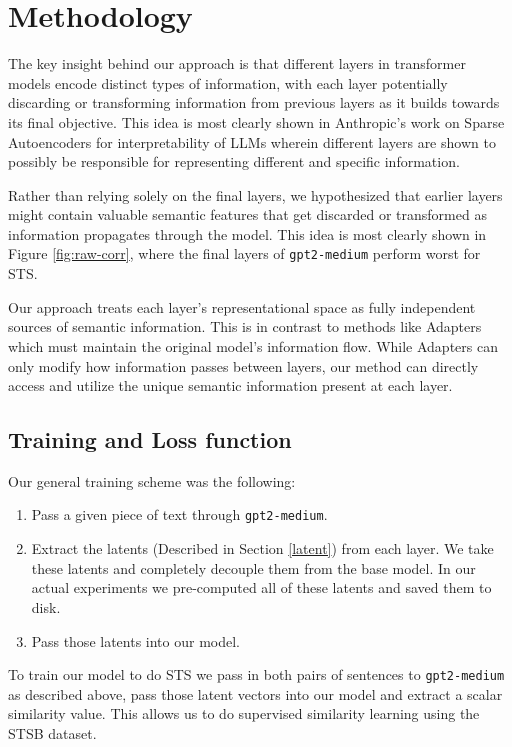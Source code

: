 \documentclass{article}
\begin{document}

\section{Methodology}
The key insight behind our approach is that different layers in transformer models encode distinct types of information, with each layer potentially discarding or transforming information from previous layers as it builds towards its final objective. This idea is most clearly shown in Anthropic's work on Sparse Autoencoders for interpretability of LLMs \cite{bricken2023monosemanticity} wherein different layers are shown to possibly be responsible for representing different and specific information.

Rather than relying solely on the final layers, we hypothesized that earlier layers might contain valuable semantic features that get discarded or transformed as information propagates through the model. This idea is most clearly shown in Figure \ref{fig:raw-corr}, where the final layers of \verb|gpt2-medium| perform worst for STS.

Our approach treats each layer's representational space as fully independent sources of semantic information. This is in contrast to methods like Adapters \cite{houlsby2019parameterefficienttransferlearningnlp} which must maintain the original model's information flow. While Adapters can only modify how information passes between layers, our method can directly access and utilize the unique semantic information present at each layer.

\subsection{Training and Loss function} \label{Loss} \label{Training}
Our general training scheme was the following:
\begin{enumerate}
    \item Pass a given piece of text through \verb|gpt2-medium|.
    \item Extract the latents (Described in Section \ref{latent}) from each layer. We take these latents and completely decouple them from the base model. In our actual experiments we pre-computed all of these latents and saved them to disk.
    \item Pass those latents into our model.
\end{enumerate}
To train our model to do STS we pass in both pairs of sentences to \verb|gpt2-medium| as described above, pass those latent vectors into our model and extract a scalar similarity value. This allows us to do supervised similarity learning using the STSB dataset.
\end{document}
